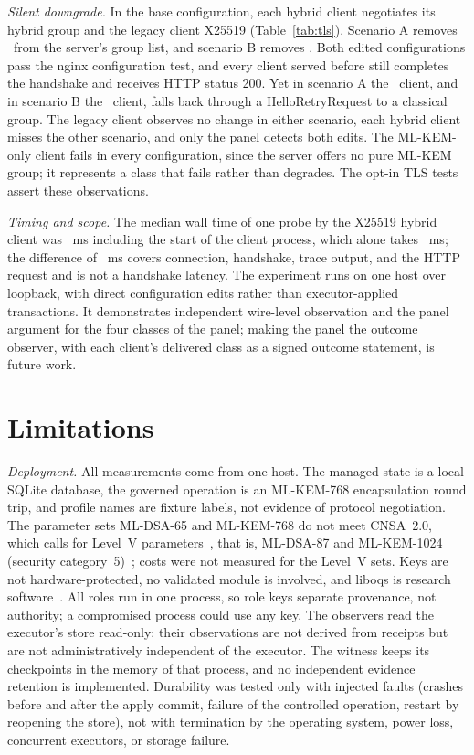 \documentclass[journal]{IEEEtran}
\begin{document}
\emph{Silent downgrade.} In the base configuration, each hybrid client negotiates its hybrid group and the legacy client X25519 (Table~\ref{tab:tls}). Scenario A removes \TlsRemovedA\ from the server's group list, and scenario B removes \TlsRemovedB. Both edited configurations pass the nginx configuration test, and every client served before still completes the handshake and receives HTTP status 200. Yet in scenario A the \TlsHitA\ client, and in scenario B the \TlsHitB\ client, falls back through a HelloRetryRequest to a classical group. The legacy client observes no change in either scenario, each hybrid client misses the other scenario, and only the panel detects both edits. The ML-KEM-only client fails in every configuration, since the server offers no pure ML-KEM group; it represents a class that fails rather than degrades. The opt-in TLS tests assert these observations.

\emph{Timing and scope.} The median wall time of one probe by the X25519 hybrid client was \TlsProbeMs~ms including the start of the client process, which alone takes \TlsBaselineMs~ms; the difference of \TlsProbeNetMs~ms covers connection, handshake, trace output, and the HTTP request and is not a handshake latency. The experiment runs on one host over loopback, with direct configuration edits rather than executor-applied transactions. It demonstrates independent wire-level observation and the panel argument for the four classes of the panel; making the panel the outcome observer, with each client's delivered class as a signed outcome statement, is future work.

\section{Limitations}
\label{sec:limits}
\emph{Deployment.} All measurements come from one host. The managed state is a local SQLite database, the governed operation is an ML-KEM-768 encapsulation round trip, and profile names are fixture labels, not evidence of protocol negotiation. The parameter sets ML-DSA-65 and ML-KEM-768 do not meet CNSA~2.0, which calls for Level~V parameters~\cite{cnsa2}, that is, ML-DSA-87 and ML-KEM-1024 (security category~5)~\cite{fips203,fips204}; costs were not measured for the Level~V sets. Keys are not hardware-protected, no validated module is involved, and liboqs is research software~\cite{liboqs}. All roles run in one process, so role keys separate provenance, not authority; a compromised process could use any key. The observers read the executor's store read-only: their observations are not derived from receipts but are not administratively independent of the executor. The witness keeps its checkpoints in the memory of that process, and no independent evidence retention is implemented. Durability was tested only with injected faults (crashes before and after the apply commit, failure of the controlled operation, restart by reopening the store), not with termination by the operating system, power loss, concurrent executors, or storage failure.
\end{document}
